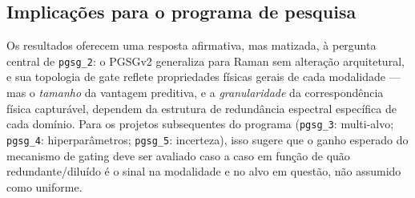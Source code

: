 \subsection{Implicações para o programa de pesquisa}

Os resultados oferecem uma resposta afirmativa, mas matizada, à pergunta central de \texttt{pgsg\_2}: o PGSGv2 generaliza para Raman sem alteração arquitetural, e sua topologia de gate reflete propriedades físicas gerais de cada modalidade --- mas o \emph{tamanho} da vantagem preditiva, e a \emph{granularidade} da correspondência física capturável, dependem da estrutura de redundância espectral específica de cada domínio. Para os projetos subsequentes do programa (\texttt{pgsg\_3}: multi-alvo; \texttt{pgsg\_4}: hiperparâmetros; \texttt{pgsg\_5}: incerteza), isso sugere que o ganho esperado do mecanismo de gating deve ser avaliado caso a caso em função de quão redundante/diluído é o sinal na modalidade e no alvo em questão, não assumido como uniforme.

